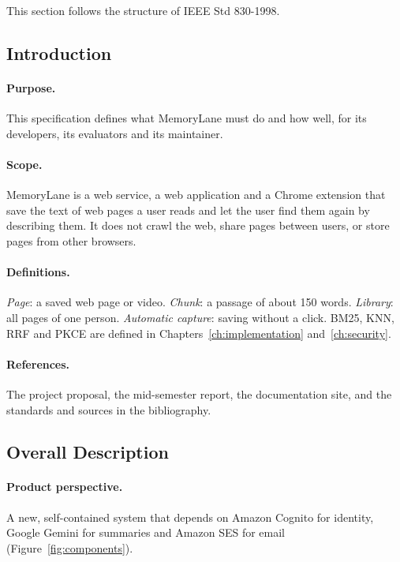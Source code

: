 This section follows the structure of IEEE Std 830-1998.

\subsection{Introduction}

\paragraph{Purpose.} This specification defines what MemoryLane must do and
how well, for its developers, its evaluators and its maintainer.

\paragraph{Scope.} MemoryLane is a web service, a web application and a
Chrome extension that save the text of web pages a user reads and let the
user find them again by describing them. It does not crawl the web, share
pages between users, or store pages from other browsers.

\paragraph{Definitions.} \emph{Page}: a saved web page or video.
\emph{Chunk}: a passage of about 150 words. \emph{Library}: all pages of one
person. \emph{Automatic capture}: saving without a click. BM25, KNN, RRF and
PKCE are defined in Chapters~\ref{ch:implementation} and~\ref{ch:security}.

\paragraph{References.} The project proposal, the mid-semester report, the
documentation site, and the standards and sources in the bibliography.

\subsection{Overall Description}

\paragraph{Product perspective.} A new, self-contained system that depends
on Amazon Cognito for identity, Google Gemini for summaries and Amazon SES for
email (Figure~\ref{fig:components}).

